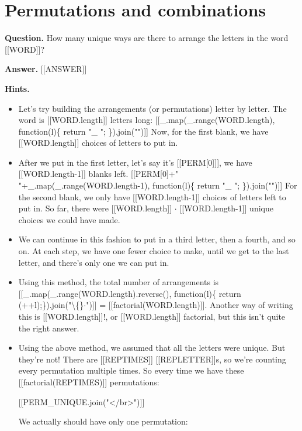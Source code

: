 \documentclass{article}
\begin{document}
\section*{Permutations and combinations}
\textbf{Question.} How many unique ways are there to arrange the letters in the word [[WORD]]?

\textbf{Answer.} [[ANSWER]]

\textbf{Hints.}
\begin{itemize}
  \item Let's try building the arrangements (or permutations) letter by letter. The word is [[WORD.length]]
                        letters long:
                        [[\_.map(\_.range(WORD.length), function(l)\{ return "\_ "; \}).join("")]]
                        Now, for the first blank, we have [[WORD.length]] choices of letters to put in.
  \item After we put in the first letter, let's say it's [[PERM[0]]], we have [[WORD.length-1]] blanks left.
                        [[PERM[0]+" "+\_.map(\_.range(WORD.length-1), function(l)\{ return "\_ "; \}).join("")]]
                        For the second blank, we only have [[WORD.length-1]] choices of letters left to put in. So far, there were
                            [[WORD.length]] $\cdot$ [[WORD.length-1]] unique choices we could have made.
  \item We can continue in this fashion to put in a third letter, then a fourth, and so on. At each step, we have one fewer choice to
                        make, until we get to the last letter, and there's only one we can put in.
  \item Using this method, the total number of arrangements is [[\_.map(\_.range(WORD.length).reverse(), function(l)\{ return (++l);\}).join("\textbackslash\{\}$\cdot$")]] = [[factorial(WORD.length)]]. Another way of writing this is [[WORD.length]]!,
                        or [[WORD.length]] factorial, but this isn't quite the right answer.
  \item Using the above method, we assumed that all the letters were unique. But they're not! There are [[REPTIMES]]
                        [[REPLETTER]]s, so we're counting every permutation multiple times. So every time we have these
                        [[factorial(REPTIMES)]] permutations:
                            
                                [[PERM\_UNIQUE.join("</br>")]]
                            
                        We actually should have only one permutation:
                            

\end{itemize}
\end{document}
